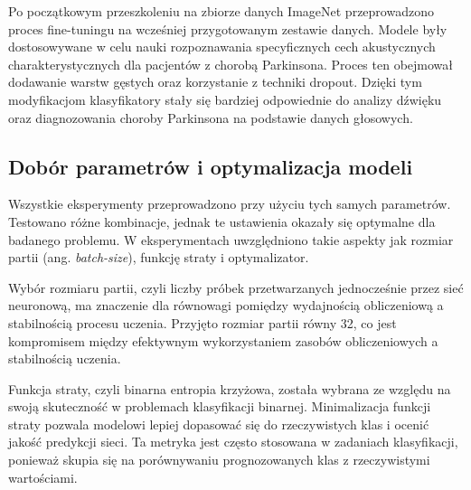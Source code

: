 Po początkowym przeszkoleniu na zbiorze danych ImageNet przeprowadzono proces fine-tuningu na wcześniej przygotowanym zestawie danych.
Modele były dostosowywane w celu nauki rozpoznawania specyficznych cech akustycznych charakterystycznych dla pacjentów z chorobą Parkinsona.
Proces ten obejmował dodawanie warstw gęstych oraz korzystanie z techniki dropout.
Dzięki tym modyfikacjom klasyfikatory stały się bardziej odpowiednie do analizy dźwięku oraz diagnozowania choroby Parkinsona na podstawie danych głosowych.



\subsection{Dobór parametrów i optymalizacja modeli}
\label{subsec:optymalizacja-modeli}

Wszystkie eksperymenty przeprowadzono przy użyciu tych samych parametrów.
Testowano różne kombinacje, jednak te ustawienia okazały się optymalne dla badanego problemu.
W eksperymentach uwzględniono takie aspekty jak rozmiar partii (ang. \emph{batch-size}), funkcję  straty i optymalizator.

Wybór rozmiaru partii, czyli liczby próbek przetwarzanych jednocześnie przez sieć neuronową, ma znaczenie dla równowagi pomiędzy wydajnością obliczeniową a stabilnością procesu  uczenia.
Przyjęto rozmiar partii równy 32, co jest kompromisem między efektywnym wykorzystaniem zasobów obliczeniowych a stabilnością uczenia.

Funkcja straty, czyli binarna entropia krzyżowa, została wybrana ze względu na swoją skuteczność w problemach klasyfikacji binarnej.
Minimalizacja funkcji straty pozwala modelowi lepiej dopasować się do rzeczywistych klas i ocenić jakość predykcji sieci.
Ta metryka jest często stosowana w zadaniach klasyfikacji, ponieważ skupia się na porównywaniu prognozowanych klas z rzeczywistymi wartościami.

